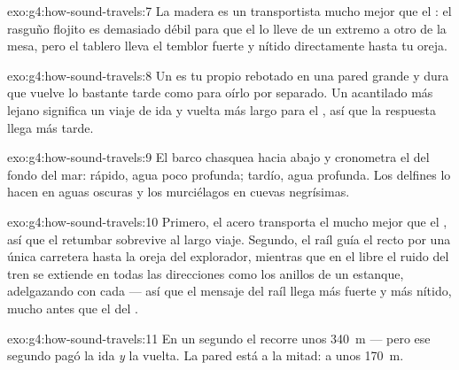 \begin{solution}{exo:g4:how-sound-travels:7}
La madera es un transportista mucho mejor que el : el rasguño
flojito es demasiado débil para que el  lo lleve de un extremo a
otro de la mesa, pero el tablero  lleva el temblor fuerte y
nítido directamente hasta tu oreja.
\end{solution}

\begin{solution}{exo:g4:how-sound-travels:8}
Un  es tu propio  rebotado en una pared grande y dura
que vuelve lo bastante tarde como para oírlo por separado. Un
acantilado más lejano significa un viaje de ida y vuelta más largo
para el , así que la respuesta llega más tarde.
\end{solution}

\begin{solution}{exo:g4:how-sound-travels:9}
El barco chasquea hacia abajo y cronometra el  del fondo del mar:
 rápido, agua poco profunda;  tardío, agua profunda. Los
delfines lo hacen en aguas oscuras y los murciélagos en cuevas
negrísimas.
\end{solution}

\begin{solution}{exo:g4:how-sound-travels:10}
Primero, el acero transporta el  mucho mejor que el , así
que el retumbar sobrevive al largo viaje. Segundo, el raíl guía el
 recto por una única carretera hasta la oreja del explorador,
mientras que en el  libre el ruido del tren se extiende en todas
las direcciones como los anillos de un estanque, adelgazando con cada
 --- así que el mensaje del raíl llega más fuerte y más nítido,
mucho antes que el del .
\end{solution}

\begin{solution}{exo:g4:how-sound-travels:11}
En un segundo el  recorre unos \qty{340}{m} --- pero ese segundo
pagó la ida \emph{y} la vuelta. La pared está a la mitad: a unos
\qty{170}{m}.
\end{solution}
